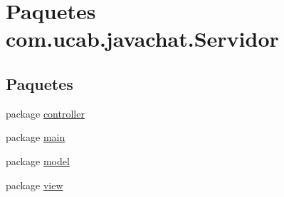 \hypertarget{namespacecom_1_1ucab_1_1javachat_1_1_servidor}{\section{Paquetes com.\-ucab.\-javachat.\-Servidor}
\label{namespacecom_1_1ucab_1_1javachat_1_1_servidor}
}
\subsection*{Paquetes}
\begin{DoxyCompactItemize}
\item 
package \hyperlink{namespacecom_1_1ucab_1_1javachat_1_1_servidor_1_1controller}{controller}
\item 
package \hyperlink{namespacecom_1_1ucab_1_1javachat_1_1_servidor_1_1main}{main}
\item 
package \hyperlink{namespacecom_1_1ucab_1_1javachat_1_1_servidor_1_1model}{model}
\item 
package \hyperlink{namespacecom_1_1ucab_1_1javachat_1_1_servidor_1_1view}{view}
\end{DoxyCompactItemize}
